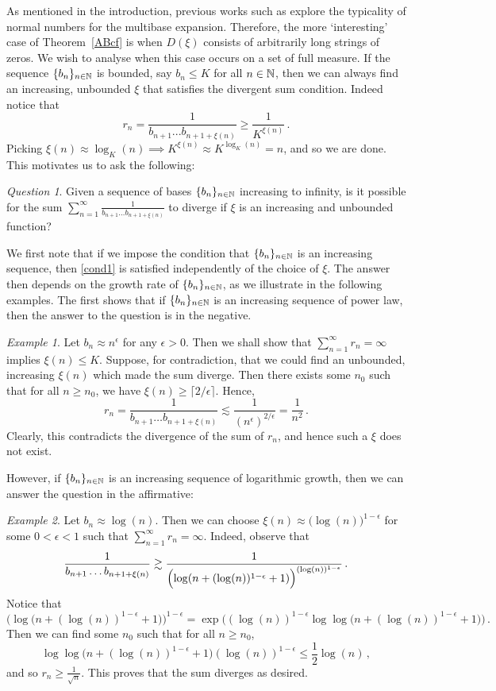 \documentclass[11pt,reqno]{amsart}
\newcommand{\N}{{\Bbb N}}
\newcommand{\0}{\mathbf{0}}
\theoremstyle{remark}
\numberwithin{equation}{section}
\newtheorem{question}{Question}
\theoremstyle{remark}
\newtheorem*{example}{Example}
\numberwithin{equation}{section}
\begin{document}
\medskip
As mentioned in the introduction, previous works such as \cite{mance} explore the typicality of normal numbers for the multibase expansion. Therefore, the more `interesting' case of Theorem~\ref{ABcf} is when $D(\xi)$ consists of arbitrarily long strings of zeros. We wish to analyse when this case occurs on a set of full measure. If the sequence $\{b_n\}_{n \in \N}$ is bounded, say $b_n \leq K$ for all $n \in \N$, then we can always find an increasing, unbounded $\xi$ that satisfies the divergent sum condition. Indeed notice that 
$$
r_n = \frac{1}{b_{n+1}...b_{n+1+\xi(n)}} \geq \frac{1}{K^{\xi(n)}} \, .
$$
Picking $\xi(n) \approx \log_K(n) \implies K^{\xi(n)}  \approx K^{\log_K(n)} = n$, and so we are done.
This motivates us to ask the following:
 \begin{question}
Given a sequence of bases $\{b_n\}_{n \in \N}$ increasing to infinity, is it possible for the sum $\sum_{n=1}^\infty\frac{1}{b_{n+1}\dots b_{n+1+\xi(n)}}$ to diverge if $\xi$ is an increasing and unbounded function?
 \end{question} 
 We first note that if we impose the condition that $\{b_n\}_{n \in \N}$ is an increasing sequence, then \eqref{cond1} is satisfied independently of the choice of $\xi$.
The answer then depends on the growth rate of $\{b_n\}_{n \in \N}$, as we illustrate in the following examples. The first shows that if $\{b_n\}_{n \in \N}$ is an increasing sequence of power law, then the answer to the question is in the negative.
\begin{example}
    Let $b_n \approx  n^\epsilon$ for any $\epsilon > 0$. Then we shall show that $\sum_{n=1}^\infty r_n = \infty$ implies $\xi(n) \leq K$. Suppose, for contradiction, that we could find an unbounded, increasing $\xi(n)$ which made the sum diverge. Then there exists some $n_0$ such that for all $n \geq n_0$, we have $\xi(n) \ge \lceil 2/\epsilon \rceil$. Hence,
    $$r_n=\frac{1}{b_{n+1}\dots b_{n+1+\xi(n)}} \lesssim \frac{ 1 }{ (n^\epsilon)^{2/\epsilon} }=\frac{1}{n^2} \, .$$ 
    Clearly, this contradicts the divergence of the sum of $r_n$, and hence such a $\xi$ does not exist.
\end{example}
However, if $\{b_n\}_{n \in \N}$ is an increasing sequence of logarithmic growth, then we can answer the question in the affirmative:
\begin{example}
Let $b_n \approx \log(n)$. Then we can choose $\xi(n) \approx \big(\log(n)\big)^{1- \epsilon}$ for some $0 < \epsilon <1$ such that $\sum_{n=1}^\infty r_n = \infty$. Indeed, observe that 
$$
\frac{1}{b_{n+1}\dots b_{n+1+\xi(n)}} \gtrsim \frac{ 1 }{ \Bigl( \log( n + (\log(n))^{1-\epsilon} + 1 ) \Bigr)^{ (\log(n))^{1-\epsilon} } }
 \, .
$$
Notice that 
$$
\Big(\log\big(n + (\log(n))^{1-\epsilon}+1\big)\Big)^{1-\epsilon} = \exp\Big((\log(n))^{1-\epsilon}\log\log \big( n + (\log(n))^{1- \epsilon} +1   \big) \Big) \, .
$$
Then we can find some $n_0$ such that for all $n \geq n_0$, 
$$
\log\log \big( n + (\log(n))^{1- \epsilon} +1   \big) (\log(n))^{1-\epsilon} \leq \frac{1}{2} \log(n) \, ,
$$
and so
$r_n \geq \frac{1}{\sqrt{n}}$. This proves that the sum diverges as desired.
\end{example}
\end{document}

